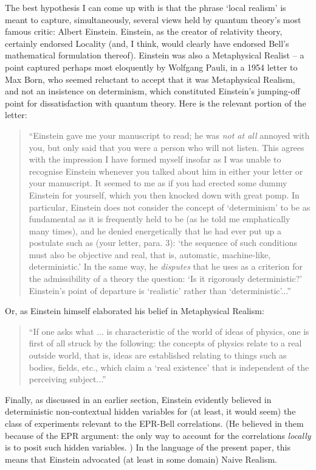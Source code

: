 \documentclass[12pt]{article}
\begin{document}
The best hypothesis I can come up with is that the phrase `local
realism' is meant to capture, simultaneously, several views held by
quantum theory's most famous critic:  Albert Einstein.  Einstein, as
the creator of relativity theory, certainly endorsed Locality (and, I
think, would clearly have endorsed Bell's mathematical formulation 
thereof).  Einstein was also a Metaphysical Realist -- a point
captured perhaps most eloquently by Wolfgang Pauli, in a 1954 letter
to Max Born, who seemed reluctant to accept that it was Metaphysical
Realism, and not an insistence on determinism, which constituted Einstein's
jumping-off point for dissatisfaction with quantum theory.  Here is
the relevant portion of the letter:
\begin{quote}
``Einstein gave me your manuscript to read; he was \emph{not at all}
annoyed with you, but only said that you were a person who will not
listen.  This agrees with the impression I have formed myself insofar
as I was unable to recognise Einstein whenever you talked about him in
either your letter or your manuscript.  It seemed to me as if you had
erected some dummy Einstein for yourself, which you then knocked down
with great pomp.  In particular, Einstein does not consider the
concept of `determinism' to be as fundamental as it is frequently held
to be (as he told me emphatically many times), and he denied
energetically that he had ever put up a postulate such as (your
letter, para. 3): `the sequence of such conditions must also be
objective and real, that is, automatic, machine-like, deterministic.'
In the same way, he \emph{disputes} that he uses as a criterion for
the admissibility of a theory the question: `Is it rigorously
deterministic?'  Einstein's point of departure is `realistic' rather than
`deterministic'...'' \cite[page 221]{bel}
\end{quote}
Or, as Einstein himself elaborated his belief in Metaphysical Realism:
\begin{quote}
``If one asks what ... is characteristic of the world of ideas of
physics, one is first of all struck by the following:  the concepts of
physics relate to a real outside world, that is, ideas are established
relating to things such as bodies, fields, etc., which claim a `real
existence' that is independent of the perceiving
subject...''\cite[170]{bel}
\end{quote}
Finally, as discussed in an earlier section, Einstein evidently
believed in deterministic non-contextual hidden variables for (at
least, it would seem) the class of experiments relevant to the 
EPR-Bell correlations.  (He believed in them because of the EPR
argument:  the only way to account for the correlations
\emph{locally} is to posit such hidden variables. \cite{nonlocchar})  
In the language of the present paper, this means that Einstein
advocated (at least in some domain) Naive Realism.  
\end{document}
